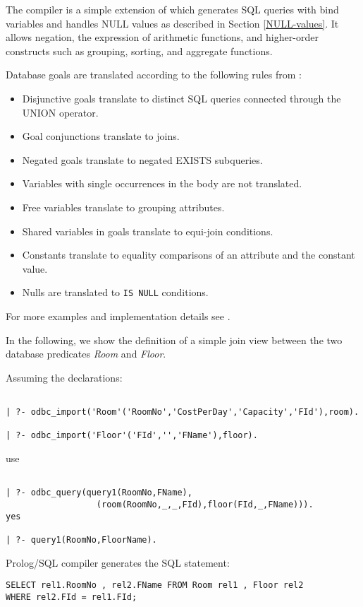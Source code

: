 The compiler is a simple extension of \cite{Drax92} which generates SQL
queries with bind variables and handles NULL values as described in
Section \ref{NULL-values}.  It allows negation, the expression
of arithmetic functions, and higher-order constructs such as grouping,
sorting, and aggregate functions.

Database goals are translated according to the following rules
from \cite{Drax92}:
\begin{itemize}
\item Disjunctive goals translate to distinct SQL queries
        connected through the UNION operator.
\item Goal conjunctions translate to joins.
\item Negated goals translate to negated EXISTS subqueries.
\item Variables with single occurrences in the body are not
          translated.
\item Free variables translate to grouping attributes.
\item Shared variables in goals translate to equi-join conditions.
\item Constants translate to equality comparisons of an attribute and
          the constant value.
\item Nulls are translated to {\tt IS NULL} conditions.
\end{itemize}
For more examples and implementation details see \cite{Drax92}.
 
In the following, we show the definition of a simple join view between the 
two database predicates {\it Room} and {\it Floor}.

Assuming the declarations:
\begin{verbatim}

| ?- odbc_import('Room'('RoomNo','CostPerDay','Capacity','FId'),room).

| ?- odbc_import('Floor'('FId','','FName'),floor).
\end{verbatim}

use

\begin{verbatim}

| ?- odbc_query(query1(RoomNo,FName),
                  (room(RoomNo,_,_,FId),floor(FId,_,FName))).
yes

| ?- query1(RoomNo,FloorName).
\end{verbatim}

Prolog/SQL compiler generates the SQL statement:
\begin{verbatim}
SELECT rel1.RoomNo , rel2.FName FROM Room rel1 , Floor rel2 
WHERE rel2.FId = rel1.FId;
\end{verbatim}

